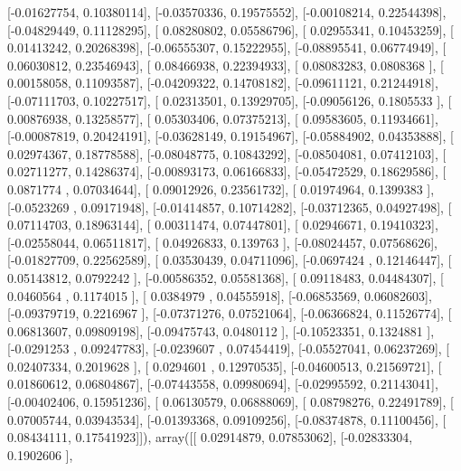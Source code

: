 \documentclass{article}
\begin{document}
       [-0.01627754,  0.10380114],
       [-0.03570336,  0.19575552],
       [-0.00108214,  0.22544398],
       [-0.04829449,  0.11128295],
       [ 0.08280802,  0.05586796],
       [ 0.02955341,  0.10453259],
       [ 0.01413242,  0.20268398],
       [-0.06555307,  0.15222955],
       [-0.08895541,  0.06774949],
       [ 0.06030812,  0.23546943],
       [ 0.08466938,  0.22394933],
       [ 0.08083283,  0.0808368 ],
       [ 0.00158058,  0.11093587],
       [-0.04209322,  0.14708182],
       [-0.09611121,  0.21244918],
       [-0.07111703,  0.10227517],
       [ 0.02313501,  0.13929705],
       [-0.09056126,  0.1805533 ],
       [ 0.00876938,  0.13258577],
       [ 0.05303406,  0.07375213],
       [ 0.09583605,  0.11934661],
       [-0.00087819,  0.20424191],
       [-0.03628149,  0.19154967],
       [-0.05884902,  0.04353888],
       [ 0.02974367,  0.18778588],
       [-0.08048775,  0.10843292],
       [-0.08504081,  0.07412103],
       [ 0.02711277,  0.14286374],
       [-0.00893173,  0.06166833],
       [-0.05472529,  0.18629586],
       [ 0.0871774 ,  0.07034644],
       [ 0.09012926,  0.23561732],
       [ 0.01974964,  0.1399383 ],
       [-0.0523269 ,  0.09171948],
       [-0.01414857,  0.10714282],
       [-0.03712365,  0.04927498],
       [ 0.07114703,  0.18963144],
       [ 0.00311474,  0.07447801],
       [ 0.02946671,  0.19410323],
       [-0.02558044,  0.06511817],
       [ 0.04926833,  0.139763  ],
       [-0.08024457,  0.07568626],
       [-0.01827709,  0.22562589],
       [ 0.03530439,  0.04711096],
       [-0.0697424 ,  0.12146447],
       [ 0.05143812,  0.0792242 ],
       [-0.00586352,  0.05581368],
       [ 0.09118483,  0.04484307],
       [ 0.0460564 ,  0.1174015 ],
       [ 0.0384979 ,  0.04555918],
       [-0.06853569,  0.06082603],
       [-0.09379719,  0.2216967 ],
       [-0.07371276,  0.07521064],
       [-0.06366824,  0.11526774],
       [ 0.06813607,  0.09809198],
       [-0.09475743,  0.0480112 ],
       [-0.10523351,  0.1324881 ],
       [-0.0291253 ,  0.09247783],
       [-0.0239607 ,  0.07454419],
       [-0.05527041,  0.06237269],
       [ 0.02407334,  0.2019628 ],
       [ 0.0294601 ,  0.12970535],
       [-0.04600513,  0.21569721],
       [ 0.01860612,  0.06804867],
       [-0.07443558,  0.09980694],
       [-0.02995592,  0.21143041],
       [-0.00402406,  0.15951236],
       [ 0.06130579,  0.06888069],
       [ 0.08798276,  0.22491789],
       [ 0.07005744,  0.03943534],
       [-0.01393368,  0.09109256],
       [-0.08374878,  0.11100456],
       [ 0.08434111,  0.17541923]]), array([[ 0.02914879,  0.07853062],
       [-0.02833304,  0.1902606 ],
\end{document}
